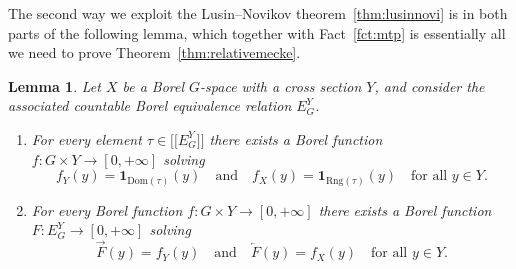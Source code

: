 \documentclass{amsart}
\numberwithin{equation}{subsection}
\newtheorem{lem}[thm]{Lemma}
\theoremstyle{remark}
\begin{document}
The second way we exploit the Lusin--Novikov theorem~\ref{thm:lusinnovi} is in both parts of the following lemma, which together with Fact~\ref{fct:mtp} is essentially all we need to prove Theorem~\ref{thm:relativemecke}.

\begin{lem}\label{lem:lusinnovi}
Let \(X\) be a Borel \(G\)-space with a cross section \(Y\), and consider the associated countable Borel equivalence relation \(E_{G}^{Y}\).
\begin{enumerate}
    \item For every element \(\tau\in\bigl[\!\bigl[E_{G}^{Y}\bigr]\!\bigr]\) there exists a Borel function \(f:G\times Y\to\left[0,+\infty\right]\) solving
    \[f_{Y}\left(y\right)=\mathbf{1}_{\mathrm{Dom}\left(\tau\right)}\left(y\right)\quad\text{and}\quad f_{X}\left(y\right)=\mathbf{1}_{\mathrm{Rng}\left(\tau\right)}\left(y\right)\quad\text{for all }y\in Y.\]
    \item For every Borel function \(f:G\times Y\to\left[0,+\infty\right]\) there exists a Borel function \(F:E_{G}^{Y}\to\left[0,+\infty\right]\) solving
    \[\overrightarrow{F}\left(y\right)=f_{Y}\left(y\right)\quad\text{and}\quad\overleftarrow{F}\left(y\right)=f_{X}\left(y\right)\quad\text{for all }y\in Y.\]
\end{enumerate}
\end{lem}
\end{document}
